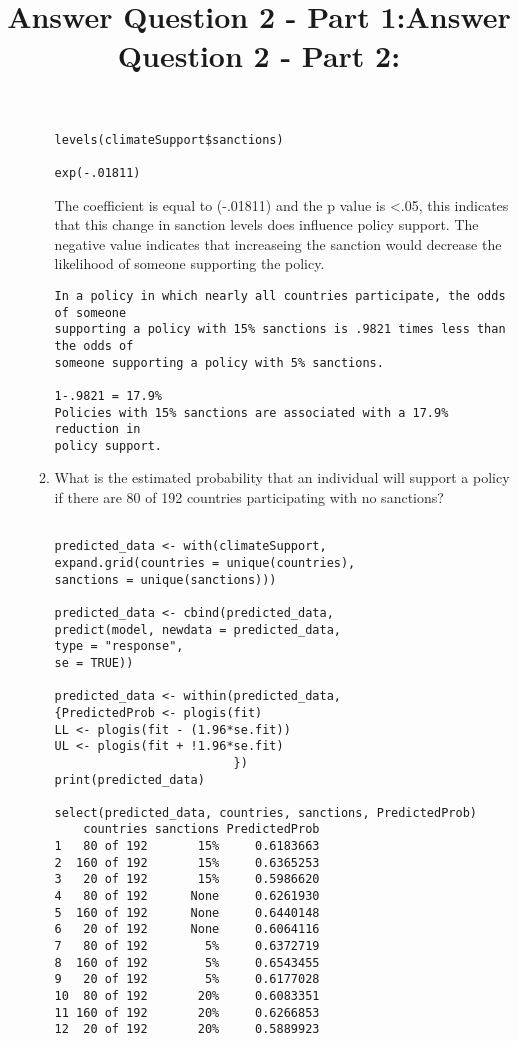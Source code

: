 \documentclass[12pt,letterpaper]{article}
\begin{document}
\begin{enumerate}
\begin{enumerate}
 \title{Answer Question 2 - Part 1:} 
 
\begin{verbatim}
levels(climateSupport$sanctions)
    
exp(-.01811)
\end{verbatim}

The coefficient is equal to (-.01811) and the p value is <.05, this indicates 
that this change in sanction levels does influence policy support. The negative value
indicates that increaseing the sanction
would decrease the likelihood of someone supporting the policy. 

\begin{verbatim}
In a policy in which nearly all countries participate, the odds of someone
supporting a policy with 15% sanctions is .9821 times less than the odds of 
someone supporting a policy with 5% sanctions. 
 
1-.9821 = 17.9%
Policies with 15% sanctions are associated with a 17.9% reduction in 
policy support. 

\end{verbatim}

		\item
		What is the estimated probability that an individual will support a policy if there are 80 of 192 countries participating with no sanctions? 
  
 \title{Answer Question 2 - Part 2:} 

\begin{verbatim}

predicted_data <- with(climateSupport, 
expand.grid(countries = unique(countries),
sanctions = unique(sanctions)))

predicted_data <- cbind(predicted_data, 
predict(model, newdata = predicted_data,
type = "response",
se = TRUE))

predicted_data <- within(predicted_data,
{PredictedProb <- plogis(fit)
LL <- plogis(fit - (1.96*se.fit))
UL <- plogis(fit + !1.96*se.fit)
                         })
print(predicted_data)

select(predicted_data, countries, sanctions, PredictedProb)
    countries sanctions PredictedProb
1   80 of 192       15%     0.6183663
2  160 of 192       15%     0.6365253
3   20 of 192       15%     0.5986620
4   80 of 192      None     0.6261930
5  160 of 192      None     0.6440148
6   20 of 192      None     0.6064116
7   80 of 192        5%     0.6372719
8  160 of 192        5%     0.6543455
9   20 of 192        5%     0.6177028
10  80 of 192       20%     0.6083351
11 160 of 192       20%     0.6266853
12  20 of 192       20%     0.5889923


\end{verbatim}
\end{enumerate}
\end{enumerate}
\end{document}
